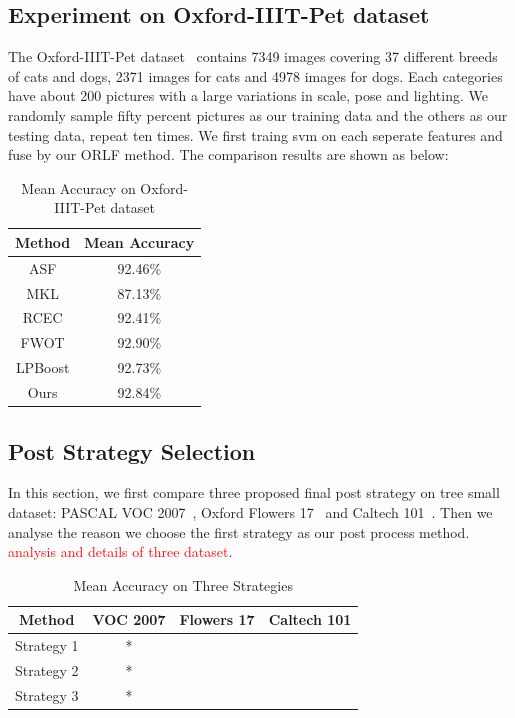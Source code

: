 \documentclass[letterpaper]{article}
\def\yanred{\textcolor{red}}
\begin{document}
\subsection{Experiment on Oxford-IIIT-Pet dataset}
The Oxford-IIIT-Pet dataset~\cite{parkhi12a} contains 7349 images covering 37 different breeds of cats and dogs, 2371 images for cats and 4978 images for dogs. Each categories have about 200 pictures with a large variations in scale, pose and lighting.
We randomly sample fifty percent pictures as our training data and the others as our testing data, repeat ten times. We first traing svm on each seperate features and fuse by our ORLF method. The comparison results are shown as below:

\begin{table}[h]\small
\centering
\label{table:oxford_pet}
\begin{tabular}{c|c}
\hline
Method                       & Mean Accuracy     \\\hline
ASF                          & 92.46\%           \\
MKL                          & 87.13\%           \\
RCEC                         & 92.41\%           \\
FWOT                         & 92.90\%           \\
LPBoost                      & 92.73\%           \\\hline
Ours                         & 92.84\%           \\
\hline
\end{tabular}
\caption{Mean Accuracy on Oxford-IIIT-Pet dataset}
\end{table}



\subsection{Post Strategy Selection}
In this section, we first compare three proposed final post strategy on tree small dataset: PASCAL VOC 2007~\cite{pascal-voc-2007}, Oxford Flowers 17~\cite{nilsback2006visual} and Caltech 101~\cite{Li2006One}. Then we analyse the reason we choose the first strategy as our post process method. \yanred{analysis and details of three dataset}.

\begin{table}[h]\small
\centering
\label{table:strategy}
\begin{tabular}{c|c|c|c}
\hline
Method                       & VOC 2007 &  Flowers 17  & Caltech 101 \\\hline
Strategy 1                   & *  &              & \\\hline
Strategy 2                   & *  &              & \\\hline
Strategy 3                   & *  &              & \\\hline
\hline
\end{tabular}
\caption{Mean Accuracy on Three Strategies}
\end{table}
\end{document}
